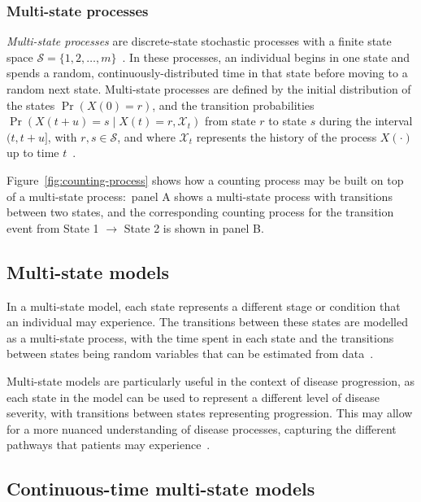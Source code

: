 \subsubsection{Multi-state processes}

\textit{Multi-state processes} are discrete-state stochastic processes with a finite state space $\mathcal{S} = \{1, 2, \ldots, m\}$~\parencite{Andersen2002-uv}. In these processes, an individual begins in one state and spends a random, continuously-distributed time in that state before moving to a random next state. Multi-state processes are defined by the initial distribution of the states $\Pr(X(0) = r)$, and the transition probabilities $\Pr(X(t + u) = s \mid X(t) = r, \mathcal{X}_t)$ from state $r$ to state $s$ during the interval $(t, t + u]$, with $r,s \in \mathcal{S}$, and where $\mathcal{X}_t$ represents the history of the process $X(\cdot)$ up to time $t$~\parencite{Aalen2008-rf}.

Figure~\ref{fig:counting-process} shows how a counting process may be built on top of a multi-state process:\ panel A shows a multi-state process with transitions between two states, and the corresponding counting process for the transition event from State 1 $\rightarrow$ State 2 is shown in panel B.



\subsection{Multi-state models}

In a multi-state model, each state represents a different stage or condition that an individual may experience. The transitions between these states are modelled as a multi-state process, with the time spent in each state and the transitions between states being random variables that can be estimated from data~\parencite{Putter2007-kb}.

Multi-state models are particularly useful in the context of disease progression, as each state in the model can be used to represent a different level of disease severity, with transitions between states representing progression. This may allow for a more nuanced understanding of disease processes, capturing the different pathways that patients may experience~\parencite{Matsena-Zingoni2021-co}.

\subsection{Continuous-time multi-state models}

